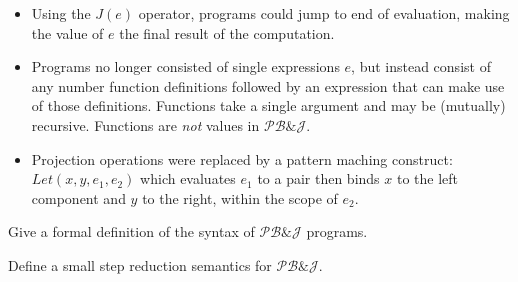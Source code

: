 \documentclass[11pt]{article}
\newcommand\mexp{e}
\newcommand\PPlang{\mathcal{PB\&J}}
\begin{document}
\begin{itemize}
\item Using the $\mathit{J}(\mexp)$ operator, programs could jump to end of
  evaluation, making the value of $\mexp$ the final result of the computation.

\item Programs no longer consisted of single expressions $\mexp$, but
  instead consist of any number function definitions followed by an
  expression that can make use of those definitions.  Functions take a
  single argument and may be (mutually) recursive.  Functions are
  \emph{not} values in $\PPlang$.

\item Projection operations were replaced by a pattern maching
  construct: $\mathit{Let}(x,y,e_1,e_2)$ which evaluates $e_1$ to a
  pair then binds $x$ to the left component and $y$ to the right,
  within the scope of $e_2$.
\end{itemize}

\vspace{.5in}

\begin{exercise}
Give a formal definition of the syntax of $\PPlang$ programs.
\end{exercise}

\newpage

\begin{exercise}
Define a small step reduction semantics for $\PPlang$.
\end{exercise}
\end{document}
